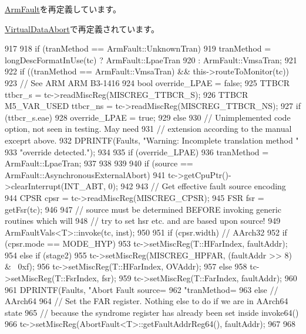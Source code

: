 \hyperlink{classArmISA_1_1ArmFault_a2bd783b42262278d41157d428e1f8d6f}{ArmFault}を再定義しています。

\hyperlink{classArmISA_1_1VirtualDataAbort_a38260dc6f5fb9598eaf95d8696e3efe8}{VirtualDataAbort}で再定義されています。


\begin{DoxyCode}
917 {
918     if (tranMethod == ArmFault::UnknownTran) {
919         tranMethod = longDescFormatInUse(tc) ? ArmFault::LpaeTran
920                                              : ArmFault::VmsaTran;
921 
922         if ((tranMethod == ArmFault::VmsaTran) && this->routeToMonitor(tc)) {
923             // See ARM ARM B3-1416
924             bool override_LPAE = false;
925             TTBCR ttbcr_s = tc->readMiscReg(MISCREG_TTBCR_S);
926             TTBCR M5_VAR_USED ttbcr_ns = tc->readMiscReg(MISCREG_TTBCR_NS);
927             if (ttbcr_s.eae) {
928                 override_LPAE = true;
929             } else {
930                 // Unimplemented code option, not seen in testing.  May need
931                 // extension according to the manual exceprt above.
932                 DPRINTF(Faults, "Warning: Incomplete translation method "
933                         "override detected.\n");
934             }
935             if (override_LPAE)
936                 tranMethod = ArmFault::LpaeTran;
937         }
938     }
939 
940     if (source == ArmFault::AsynchronousExternalAbort) {
941         tc->getCpuPtr()->clearInterrupt(INT_ABT, 0);
942     }
943     // Get effective fault source encoding
944     CPSR cpsr = tc->readMiscReg(MISCREG_CPSR);
945     FSR  fsr  = getFsr(tc);
946 
947     // source must be determined BEFORE invoking generic routines which will
948     // try to set hsr etc. and are based upon source!
949     ArmFaultVals<T>::invoke(tc, inst);
950 
951     if (cpsr.width) {  // AArch32
952         if (cpsr.mode == MODE_HYP) {
953             tc->setMiscReg(T::HFarIndex, faultAddr);
954         } else if (stage2) {
955             tc->setMiscReg(MISCREG_HPFAR, (faultAddr >> 8) & ~0xf);
956             tc->setMiscReg(T::HFarIndex,  OVAddr);
957         } else {
958             tc->setMiscReg(T::FsrIndex, fsr);
959             tc->setMiscReg(T::FarIndex, faultAddr);
960         }
961         DPRINTF(Faults, "Abort Fault source=%
962                 "tranMethod=%
963     } else {  // AArch64
964         // Set the FAR register.  Nothing else to do if we are in AArch64 state
965         // because the syndrome register has already been set inside invoke64()
966         tc->setMiscReg(AbortFault<T>::getFaultAddrReg64(), faultAddr);
967     }
968 }
\end{DoxyCode}
